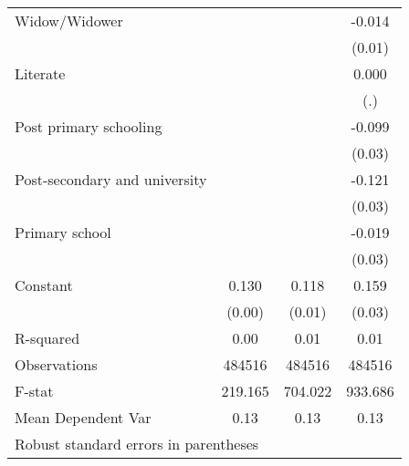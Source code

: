 {\begin{tabular}{l*{3}{c}}
Widow/Widower       &                     &                     &      -0.014         \\
                    &                     &                     &      (0.01)         \\
Literate            &                     &                     &       0.000         \\
                    &                     &                     &         (.)         \\
Post primary schooling&                     &                     &      -0.099\sym{***}\\
                    &                     &                     &      (0.03)         \\
Post-secondary and university&                     &                     &      -0.121\sym{***}\\
                    &                     &                     &      (0.03)         \\
Primary school      &                     &                     &      -0.019         \\
                    &                     &                     &      (0.03)         \\
Constant            &       0.130\sym{***}&       0.118\sym{***}&       0.159\sym{***}\\
                    &      (0.00)         &      (0.01)         &      (0.03)         \\
\hline
R-squared           &        0.00         &        0.01         &        0.01         \\
Observations        &      484516         &      484516         &      484516         \\
F-stat              &     219.165         &     704.022         &     933.686         \\
Mean Dependent Var  &        0.13         &        0.13         &        0.13         \\
\hline\hline
\multicolumn{4}{l}{\footnotesize Robust standard errors in parentheses}\\
\end{tabular}
}
